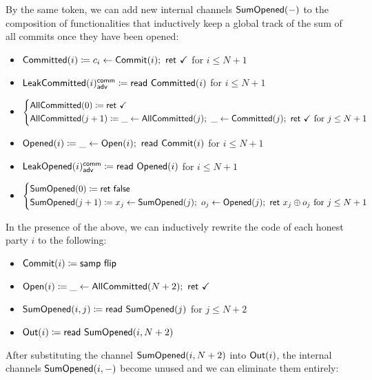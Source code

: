 \noindent By the same token, we can add new internal channels $\mathsf{SumOpened}(-)$ to the composition of functionalities that inductively keep a global track of the sum of all commits once they have been opened:

\begin{itemize}
\item {\color{magenta} $\mathsf{Committed}(i) \coloneqq c_i \leftarrow \mathsf{Commit}(i); \ \mathsf{ret} \ \checkmark$ for $i \leq N+1$}
\item {\color{magenta} $\mathsf{LeakCommitted}(i)^{\mathsf{comm}}_{\mathsf{adv}} \coloneqq \mathsf{read} \ \mathsf{Committed}(i)$ for $i \leq N+1$}
\item {\color{magenta} $\begin{cases*} \AllCommitted(0) \coloneqq \ret{\checkmark} \\ \AllCommitted(j+1) \coloneqq \_ \leftarrow \AllCommitted(j); \ \_ \leftarrow \Committed(j); \ \ret{\checkmark} \text{ for $j \leq N+1$} \end{cases*}$}
\item {\color{red} $\mathsf{Opened}(i) \coloneqq \_ \leftarrow \mathsf{Open}(i); \ \mathsf{read} \ \mathsf{Commit}(i)$ for $i \leq N+1$}
\item {\color{red} $\mathsf{LeakOpened}(i)^{\mathsf{comm}}_{\mathsf{adv}} \coloneqq \mathsf{read} \ \mathsf{Opened}(i)$ for $i \leq N+1$}
\item {\color{red} $\begin{cases*} \SumOpened(0) \coloneqq \ret{\false} \\ \SumOpened(j+1) \coloneqq x_j \leftarrow \SumOpened(j); \ o_j \leftarrow \Opened(j); \ \ret{x_j \oplus o_j} \text{ for $j \leq N+1$} \end{cases*}$}
\end{itemize}

\noindent In the presence of the above, we can inductively rewrite the code of each honest party $i$ to the following:

\begin{itemize}
\item {\color{blue} $\mathsf{Commit}(i) \coloneqq \mathsf{samp} \ \mathsf{flip}$}
\item {\color{teal} $\Open(i) \coloneqq \_ \leftarrow \AllCommitted(N+2); \ \ret{\checkmark}$}
\item {\color{red} $\mathsf{SumOpened}(i,j) \coloneqq \mathsf{read} \ \mathsf{SumOpened}(j)$ for $j \leq N+2$}
\item $\mathsf{Out}(i) \coloneqq \mathsf{read} \ \mathsf{SumOpened}(i,N+2)$
\end{itemize}

\noindent After substituting the channel $\mathsf{SumOpened}(i,N+2)$ into $\mathsf{Out}(i)$, the internal channels $\mathsf{SumOpened}(i,-)$ become unused and we can eliminate them entirely:

